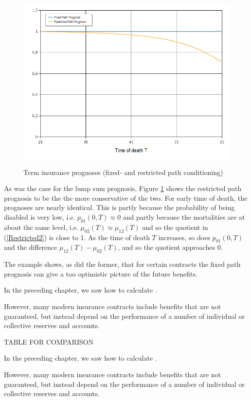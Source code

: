 \documentclass{article}
\newcommand{\1}[1]{\mathbbm{1}_{\left\lbrace #1 \right\rbrace}}
\theoremstyle{break}
\theoremstyle{remark}
\numberwithin{equation}{section}
\begin{document}
\begin{figure}[H]
	\centering
	\caption{Term insurance prognoses (fixed- and restricted path conditioning)}
	\includegraphics[width=\textwidth]{Term} \label{Term}
\end{figure}

As was the case for the lump sum prognosis, Figure \ref{Term} shows the restricted path prognosis to be the the more conservative of the two. For early time of death, the prognoses are nearly identical. This is partly because the probability of being disabled is very low, i.e. $p_{01}(0,T) \approx 0$ and partly because the mortalities are at about the same level, i.e. $\mu_{02}(T) \approx \mu_{12}(T)$ and so the quotient in (\ref{Restricted2}) is close to 1. As the time of death $T$ increases, so does $p_{01}(0,T)$ and the difference $\mu_{12}(T) - \mu_{02}(T)$, and so the quotient approaches 0.

The example shows, as did the former, that for certain contracts the fixed path prognosis can give a too optimistic picture of the future benefits.

In the preceding chapter, we saw how to calculate .

However, many modern insurance contracts include benefits that are not guaranteed, but instead depend on the performance of a number of individual or collective reserves and accounts. 

TABLE FOR COMPARISON

In the preceding chapter, we saw how to calculate .

However, many modern insurance contracts include benefits that are not guaranteed, but instead depend on the performance of a number of individual or collective reserves and accounts. 
\end{document}
